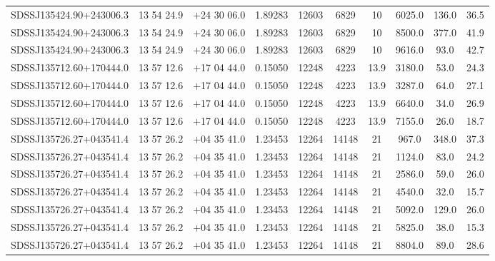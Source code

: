 \begin{landscape}
\begin{center}
\begin{longtable}{l c c c c c c c c c}
SDSSJ135424.90+243006.3  & 13 54 24.9  &         $+$24 30 06.0  &       1.89283  & 12603  &   6829  &       10  &        6025.0  &  136.0  &  36.5  \\
SDSSJ135424.90+243006.3  & 13 54 24.9  &         $+$24 30 06.0  &       1.89283  & 12603  &   6829  &       10  &        8500.0  &  377.0  &  41.9  \\
SDSSJ135424.90+243006.3  & 13 54 24.9  &         $+$24 30 06.0  &       1.89283  & 12603  &   6829  &       10  &        9616.0  &  93.0  &   42.7  \\
SDSSJ135712.60+170444.0  & 13 57 12.6  &         $+$17 04 44.0  &       0.15050  & 12248  &   4223  &       13.9  &      3180.0  &  53.0  &   24.3  \\
SDSSJ135712.60+170444.0  & 13 57 12.6  &         $+$17 04 44.0  &       0.15050  & 12248  &   4223  &       13.9  &      3287.0  &  64.0  &   27.1  \\
SDSSJ135712.60+170444.0  & 13 57 12.6  &         $+$17 04 44.0  &       0.15050  & 12248  &   4223  &       13.9  &      6640.0  &  34.0  &   26.9  \\
SDSSJ135712.60+170444.0  & 13 57 12.6  &         $+$17 04 44.0  &       0.15050  & 12248  &   4223  &       13.9  &      7155.0  &  26.0  &   18.7  \\
SDSSJ135726.27+043541.4  & 13 57 26.2  &         $+$04 35 41.0  &       1.23453  & 12264  &   14148  &      21  &        967.0  &   348.0  &  37.3  \\
SDSSJ135726.27+043541.4  & 13 57 26.2  &         $+$04 35 41.0  &       1.23453  & 12264  &   14148  &      21  &        1124.0  &  83.0  &   24.2  \\
SDSSJ135726.27+043541.4  & 13 57 26.2  &         $+$04 35 41.0  &       1.23453  & 12264  &   14148  &      21  &        2586.0  &  59.0  &   26.0  \\
SDSSJ135726.27+043541.4  & 13 57 26.2  &         $+$04 35 41.0  &       1.23453  & 12264  &   14148  &      21  &        4540.0  &  32.0  &   15.7  \\
SDSSJ135726.27+043541.4  & 13 57 26.2  &         $+$04 35 41.0  &       1.23453  & 12264  &   14148  &      21  &        5092.0  &  129.0  &  26.0  \\
SDSSJ135726.27+043541.4  & 13 57 26.2  &         $+$04 35 41.0  &       1.23453  & 12264  &   14148  &      21  &        5825.0  &  38.0  &   15.3  \\
SDSSJ135726.27+043541.4  & 13 57 26.2  &         $+$04 35 41.0  &       1.23453  & 12264  &   14148  &      21  &        8804.0  &  89.0  &   28.6  \\

\end{longtable}
\end{center}
\end{landscape}

